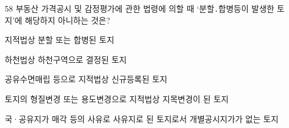 \begin{question}{58}
부동산 가격공시 및 감정평가에 관한 법령에 의할 때 ‘분할․합병등이 발생한 토지’에 해당하지 아니하는 것은?
\begin{choices}
  \item 지적법상 분할 또는 합병된 토지
  \item 하천법상 하천구역으로 결정된 토지
  \item 공유수면매립 등으로 지적법상 신규등록된 토지
  \item 토지의 형질변경 또는 용도변경으로 지적법상 지목변경이 된 토지
  \item 국·공유지가 매각 등의 사유로 사유지로 된 토지로서 개별공시지가가 없는 토지
\end{choices}
\end{question}
